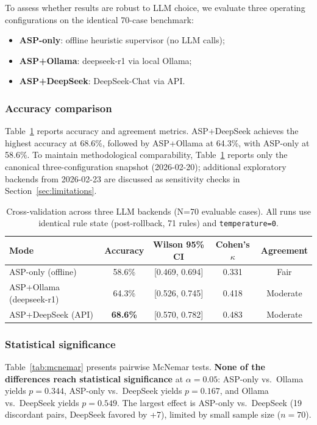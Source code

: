 \documentclass[11pt]{article}
\begin{document}
To assess whether results are robust to LLM choice, we evaluate three operating configurations on the identical 70-case benchmark:
\begin{itemize}[nosep]
  \item \textbf{ASP-only}: offline heuristic supervisor (no LLM calls);
  \item \textbf{ASP+Ollama}: deepseek-r1 via local Ollama;
  \item \textbf{ASP+DeepSeek}: DeepSeek-Chat via API.
\end{itemize}

\subsubsection{Accuracy comparison}

Table~\ref{tab:crossval} reports accuracy and agreement metrics. ASP+DeepSeek achieves the highest accuracy at 68.6\%, followed by ASP+Ollama at 64.3\%, with ASP-only at 58.6\%.
To maintain methodological comparability, Table~\ref{tab:crossval} reports only the canonical three-configuration snapshot (2026-02-20); additional exploratory backends from 2026-02-23 are discussed as sensitivity checks in Section~\ref{sec:limitations}.

\begin{table}[h]
\centering
\begin{tabular}{lcccc}
\toprule
Mode & Accuracy & Wilson 95\% CI & Cohen's $\kappa$ & Agreement \\
\midrule
ASP-only (offline) & 58.6\% & [0.469, 0.694] & 0.331 & Fair \\
ASP+Ollama (deepseek-r1) & 64.3\% & [0.526, 0.745] & 0.418 & Moderate \\
ASP+DeepSeek (API) & \textbf{68.6\%} & [0.570, 0.782] & 0.483 & Moderate \\
\bottomrule
\end{tabular}
\caption{Cross-validation across three LLM backends (N=70 evaluable cases). All runs use identical rule state (post-rollback, 71 rules) and \texttt{temperature=0}.}
\label{tab:crossval}
\end{table}

\subsubsection{Statistical significance}

Table~\ref{tab:mcnemar} presents pairwise McNemar tests.
\textbf{None of the differences reach statistical significance} at $\alpha=0.05$: ASP-only vs.~Ollama yields $p = 0.344$, ASP-only vs.~DeepSeek yields $p = 0.167$, and Ollama vs.~DeepSeek yields $p = 0.549$. The largest effect is ASP-only vs.~DeepSeek (19 discordant pairs, DeepSeek favored by +7), limited by small sample size ($n=70$).
\end{document}
